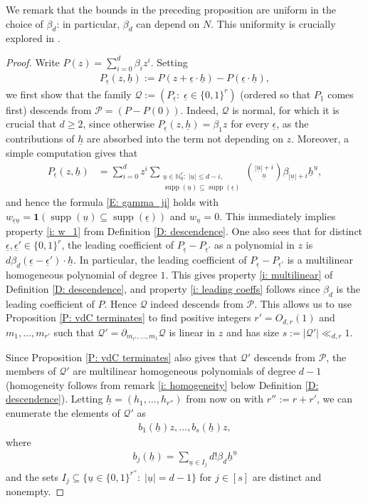 \documentclass[11pt]{amsart}
\theoremstyle{definition}
\newcommand{\N}{{\mathbb N}}
\newcommand{\CP}{{\mathcal P}}
\newcommand{\CQ}{{\mathcal Q}}
\newcommand{\uh}{{\underline{h}}}
\newcommand{\uu}{{\underline{u}}}
\newcommand{\ueps}{{\underline{\epsilon}}}
\DeclareMathOperator{\supp}{supp}
\begin{document}
We remark that the bounds in the preceding proposition are uniform in the choice of $\beta_d$: in particular, $\beta_d$ can depend on $N$. This uniformity is crucially explored in \cite{KKL24b}.
\begin{proof}

    Write $P(z) =  \sum_{i=0}^d \beta_i z^i$. Setting 
    \begin{align*}
        P_\ueps(z,\uh) := P(z+\ueps\cdot\uh) - P(\ueps\cdot\uh),
    \end{align*}
    we first show that the family 
    $\CQ := (P_\ueps:\; \ueps\in\{0,1\}^r)$ 
    (ordered so that $P_{\underline{1}}$ comes first) descends from $\CP=(P - P(0))$. Indeed, $\CQ$ is normal, for which it is crucial that $d\geq 2$, since otherwise $P_\ueps(z, \uh) = \beta_1 z$ for every $\ueps$, as the contributions of $\uh$ are absorbed into the term not depending on $z$. 
    Moreover, a simple computation gives that
    \begin{align*}
        P_\ueps(z,\uh) &= \sum_{i=0}^d z^i \sum_{\substack{\uu\in\N_0^r:\; |\uu|\leq d-i,\\ \supp(\uu)\subseteq\supp(\ueps)}}{{|\uu|+i}\choose{\uu}}\beta_{|\uu|+i} \uh^\uu, 
    \end{align*}
    and hence the formula \eqref{E: gamma_ji} holds with $w_{\ueps\uu} = \mathbf{1}(\supp(\uu)\subseteq\supp(\ueps))$ and $w_\uu = 0$. This immediately implies property \eqref{i: w_1} from Definition \ref{D: descendence}. One also sees that for distinct $\ueps,\ueps'\in\{0,1\}^r$, the leading coefficient of 
    $P_\ueps-P_{\ueps'}$ as a polynomial in $z$ is $d \beta_d (\ueps-\ueps')\cdot\uh$. In particular, the leading coefficient of $P_\ueps-P_{\ueps'}$ is a multilinear homogeneous polynomial of degree $1$. This gives property \eqref{i: multilinear} of Definition \ref{D: descendence}, and property \eqref{i: leading coeffs} follows since $\beta_d$ is the leading coefficient of $P$. 
    Hence $\CQ$ indeed descends from $\CP$. This allows us to use Proposition \ref{P: vdC terminates} to find positive integers $r'=O_{d,r}(1)$ and $m_1, \ldots, m_{r'}$ such that $\CQ'=\partial_{m_{r'}, \ldots, m_1}\CQ$ is linear in $z$ and has size $s:=|\CQ'|\ll_{d,r} 1$.
    
    Since Proposition \ref{P: vdC terminates} also gives that $\CQ'$ descends from $\CP$, the members of $\CQ'$ are multilinear homogeneous polynomials of degree $d-1$ (homogeneity follows from remark \eqref{i: homogeneity} below Definition \ref{D: descendence}). Letting $\uh = (h_1, \ldots, h_{r''})$ from now on with  $r'':=r+r'$, we can enumerate the elements of $\CQ'$ as
    \begin{align*}
    b_1(\uh)z, \ldots, b_s(\uh)z,
    \end{align*}
     where
    \begin{align*}
    b_j(\uh) = \sum_{\uu\in I_j}d! \beta_d \uh^\uu
    \end{align*}
    and the sets $I_j\subseteq \{\uu\in\{0,1\}^{r''}:\; |\uu| = d-1\}$ for $j\in[s]$ are distinct and nonempty.


\end{proof}
\end{document}

